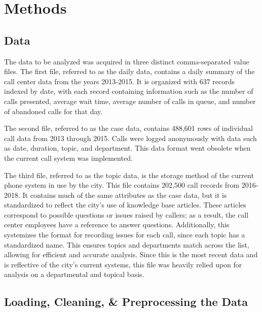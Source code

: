 \documentclass{article}
\begin{document}
\section{Methods}

	\subsection{Data}

The data to be analyzed was acquired in three distinct comma-separated value files.  The first file, referred to as the daily data, contains a daily summary of the call center data from the years 2013-2015.  It is organized with 637 records indexed by date, with each record containing information such as the number of calls presented, average wait time, average number of calls in queue, and number of abandoned calls for that day.
\par
The second file, referred to as the case data, contains 488,601 rows of individual call data from 2013 through 2015.  Calls were logged anonymously with data such as date, duration, topic, and department.  This data format went obsolete when the current call system was implemented.
\par
The third file, referred to as the topic data, is the storage method of the current phone system in use by the city.  This file contains 202,500 call records from 2016-2018.  It contains much of the same attributes as the case data, but it is standardized to reflect the city's use of knowledge base articles.  These articles correspond to possible questions or issues raised by callers; as a result, the call center employees have a reference to answer questions.  Additionally, this systemizes the format for recording issues for each call, since each topic has a standardized name.  This ensures topics and departments match across the list, allowing for efficient and accurate analysis.  Since this is the most recent data and is reflective of the city's current systems, this file was heavily relied upon for analysis on a departmental and topical basis.

	\subsection{Loading, Cleaning, \& Preprocessing the Data}
\end{document}
